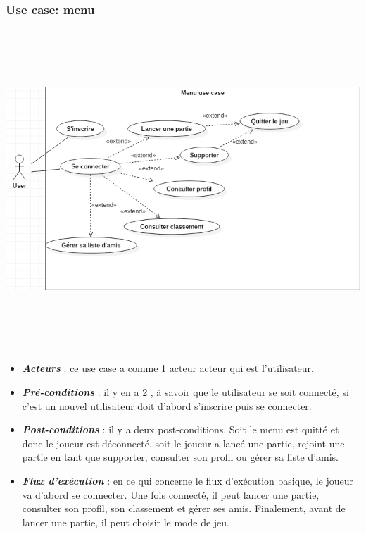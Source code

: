 \documentclass[10pt,a4paper]{article}
\begin{document}
\subsubsection{Use case: menu}
\begin{center}
    \includegraphics[height=12cm,width=16.45cm]{menu_use_case.png}
\end{center}
\par
\begin{itemize}
\item \textit{\textbf{Acteurs}} : ce use case a comme  1 acteur acteur qui est l'\gls{utilisateur}.\\

\item \textit{\textbf{Pré-conditions}} : il y en a 2 , à savoir que le \gls{utilisateur} se soit connecté, si c'est un nouvel utilisateur doit d'abord s'inscrire puis se connecter.\\

\item \textit{\textbf{Post-conditions}} : il y a deux post-conditions. Soit le menu est quitté et donc le \gls{joueur} est déconnecté, soit le \gls{joueur} a lancé une partie, rejoint une partie en tant que supporter, consulter son profil ou gérer sa liste d'amis.\\

\item \textit{\textbf{Flux d'exécution}} : en ce qui concerne le flux d'exécution basique, le \gls{joueur} va d'abord se connecter. Une fois connecté, il peut lancer une partie, consulter son profil, son classement et gérer ses amis. Finalement, avant de lancer une partie, il peut choisir le mode de jeu.

\end{itemize}    
\end{document}
